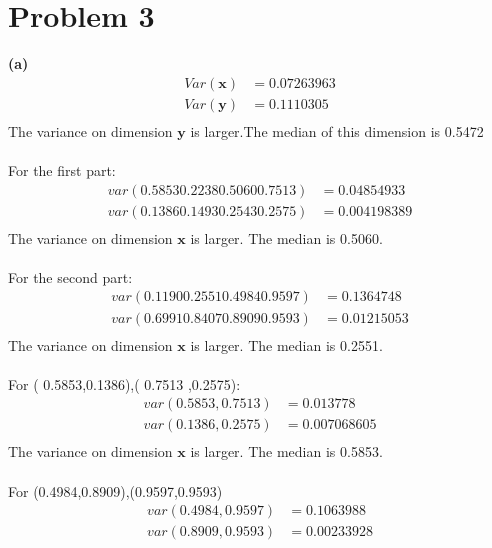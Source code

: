 \documentclass[11pt]{scrartcl}
\begin{document}
\section*{Problem 3}
 \textbf{(a)}\\
\begin{equation*}
\begin{aligned}
Var(\bm{x})&=0.07263963\\
Var(\bm{y})&=0.1110305\\
\end{aligned}
\end{equation*}
The variance on dimension $\bm{y}$ is larger.The median of this dimension is 0.5472\\
\\
For the first part:\\
\begin{equation*}
\begin{aligned}
var(0.5853 0.2238 0.5060 0.7513)&=0.04854933\\
var( 0.1386 0.1493 0.2543 0.2575)&=0.004198389\\
\end{aligned}
\end{equation*}
The variance on dimension $\bm{x}$ is larger. The median is 0.5060.\\
\\
For the second part:\\
\begin{equation*}
\begin{aligned}
var(0.1190 0.2551 0.4984 0.9597)&=0.1364748\\
var(0.6991 0.8407 0.8909 0.9593)&=0.01215053\\
\end{aligned}
\end{equation*}
The variance on dimension $\bm{x}$ is larger. The median is 0.2551.\\
\\
For ( 0.5853,0.1386),( 0.7513 ,0.2575):
\begin{equation*}
\begin{aligned}
var(0.5853,0.7513)&=0.013778\\
var(0.1386 ,0.2575)&=0.007068605\\
\end{aligned}
\end{equation*}
The variance on dimension $\bm{x}$ is larger. The median is 0.5853.\\
\\
For  (0.4984,0.8909),(0.9597,0.9593)
\begin{equation*}
\begin{aligned}
var(0.4984,0.9597)&=0.1063988\\
var(0.8909,0.9593)&=0.00233928\\
\end{aligned}
\end{equation*}
\end{document}
